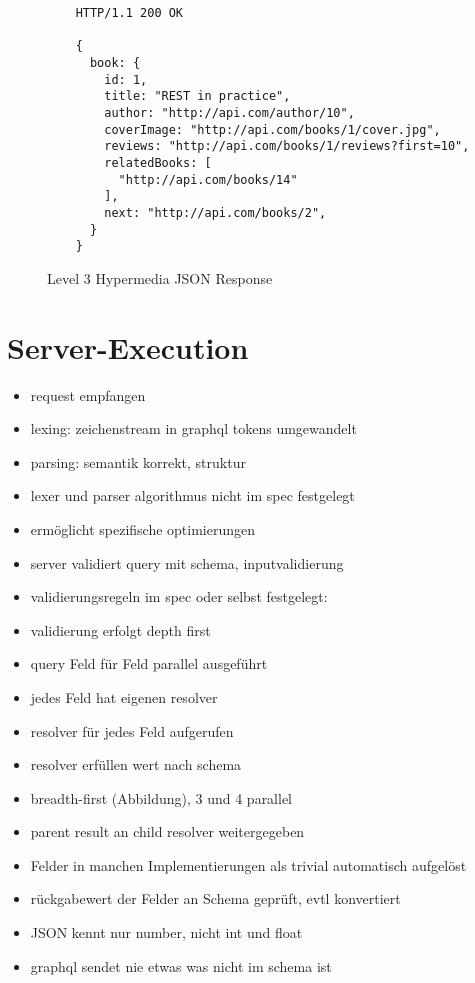 
\begin{figure}[h]
  \centering
  \begin{verbatim}
    HTTP/1.1 200 OK
  
    {
      book: {
        id: 1,
        title: "REST in practice",
        author: "http://api.com/author/10",
        coverImage: "http://api.com/books/1/cover.jpg",
        reviews: "http://api.com/books/1/reviews?first=10",
        relatedBooks: [
          "http://api.com/books/14"
        ],
        next: "http://api.com/books/2",
      }
    }
  \end{verbatim}
  \caption{Level 3 Hypermedia JSON Response}\label{code:lvl3}
\end{figure}

\section{Server-Execution}
\begin{itemize}
  \item request empfangen
  \item lexing: zeichenstream in graphql tokens umgewandelt
  \item parsing: semantik korrekt, struktur
  \item lexer und parser algorithmus nicht im spec festgelegt
  \item ermöglicht spezifische optimierungen
  \item server validiert query mit schema, inputvalidierung
  \item validierungsregeln im spec oder selbst festgelegt:
  \item validierung erfolgt depth first
  \item query Feld für Feld parallel ausgeführt
  \item jedes Feld hat eigenen resolver
  \item resolver für jedes Feld aufgerufen
  \item resolver erfüllen wert nach schema
  \item breadth-first (Abbildung), 3 und 4 parallel
  \item parent result an child resolver weitergegeben
  \item Felder in manchen Implementierungen als trivial automatisch aufgelöst
  \item rückgabewert der Felder an Schema geprüft, evtl konvertiert
  \item JSON kennt nur number, nicht int und float
  \item graphql sendet nie etwas was nicht im schema ist
\end{itemize}